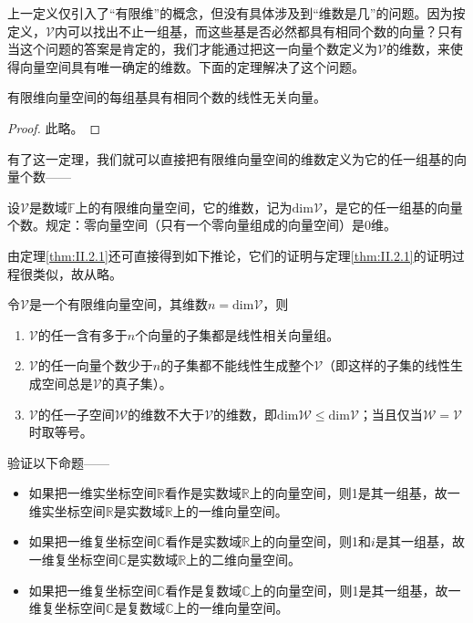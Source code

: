 \documentclass[main.tex]{subfiles}
\begin{document}
上一定义仅引入了“有限维”的概念，但没有具体涉及到“维数是几”的问题。因为按定义，$\mathcal{V}$内可以找出不止一组基，而这些基是否必然都具有相同个数的向量？只有当这个问题的答案是肯定的，我们才能通过把这一向量个数定义为$\mathcal{V}$的维数，来使得向量空间具有唯一确定的维数。下面的定理解决了这个问题。

\begin{theorem}\label{thm:II.2.1}
有限维向量空间的每组基具有相同个数的线性无关向量。
\end{theorem}
\begin{proof}
此略\cite[“(3)的证明”，p.~171]{周胜林2012线性代数}\cite[\S 2.3,Theorem 4,p.~44]{Hoffman1971}。
\end{proof}

有了这一定理，我们就可以直接把有限维向量空间的维数定义为它的任一组基的向量个数——

\begin{definition}\label{def:II.2.6}
设$\mathcal{V}$是数域$\mathbb{F}$上的有限维向量空间，它的维数，记为$\mathrm{dim}\mathcal{V}$，是它的任一组基的向量个数。规定：零向量空间（只有一个零向量组成的向量空间）是0维。
\end{definition}

由定理\ref{thm:II.2.1}还可直接得到如下推论，它们的证明与定理\ref{thm:II.2.1}的证明过程很类似，故从略。

\begin{corollary}
令$\mathcal{V}$是一个有限维向量空间，其维数$n=\mathrm{dim}\mathcal{V}$，则
\begin{enumerate}
    \item $\mathcal{V}$的任一含有多于$n$个向量的子集都是线性相关向量组\cite[“(3)的证明”，p.~171]{周胜林2012线性代数}。
    \item $\mathcal{V}$的任一向量个数少于$n$的子集都不能线性生成整个$\mathcal{V}$（即这样的子集的线性生成空间总是$\mathcal{V}$的真子集）。
    \item $\mathcal{V}$的任一子空间$\mathcal{W}$的维数不大于$\mathcal{V}$的维数，即$\mathrm{dim}\mathcal{W}\leq\mathrm{dim}\mathcal{V}$；当且仅当$\mathcal{W}=\mathcal{V}$时取等号。
\end{enumerate}
\end{corollary}

\begin{example}
验证以下命题——
\begin{itemize}
    \item 如果把一维实坐标空间$\mathbb{R}$看作是实数域$\mathbb{R}$上的向量空间，则1是其一组基，故一维实坐标空间$\mathbb{R}$是实数域$\mathbb{R}$上的一维向量空间。
    \item 如果把一维复坐标空间$\mathbb{C}$看作是实数域$\mathbb{R}$上的向量空间，则1和$i$是其一组基，故一维复坐标空间$\mathbb{C}$是实数域$\mathbb{R}$上的二维向量空间。
    \item 如果把一维复坐标空间$\mathbb{C}$看作是复数域$\mathbb{C}$上的向量空间，则1是其一组基，故一维复坐标空间$\mathbb{C}$是复数域$\mathbb{C}$上的一维向量空间。
\end{itemize}
\end{example}
\end{document}
